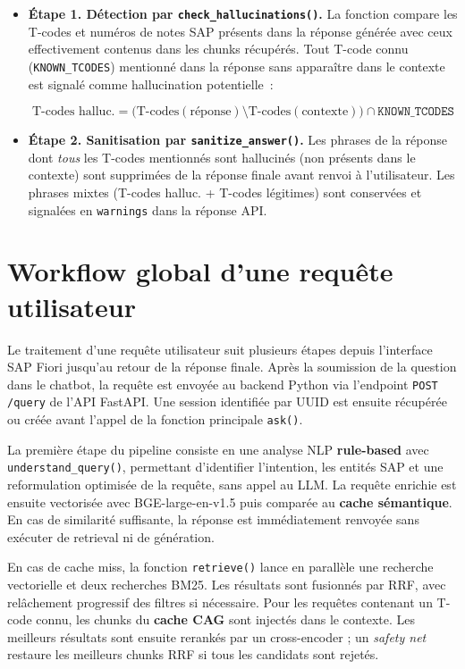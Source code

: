 \begin{itemize}
  \item \textbf{Étape 1. Détection par \texttt{check\_hallucinations()}.} La fonction compare les T-codes et numéros de notes SAP présents dans la réponse générée avec ceux effectivement contenus dans les chunks récupérés. Tout T-code connu (\texttt{KNOWN\_TCODES}) mentionné dans la réponse sans apparaître dans le contexte est signalé comme hallucination potentielle~:

\[
\text{T-codes halluc.} = \bigl(\text{T-codes}(\text{réponse}) \setminus \text{T-codes}(\text{contexte})\bigr) \cap \texttt{KNOWN\_TCODES}
\]

  \item \textbf{Étape 2. Sanitisation par \texttt{sanitize\_answer()}.} Les phrases de la réponse dont \textit{tous} les T-codes mentionnés sont hallucinés (non présents dans le contexte) sont supprimées de la réponse finale avant renvoi à l’utilisateur. Les phrases mixtes (T-codes halluc. + T-codes légitimes) sont conservées et signalées en \texttt{warnings} dans la réponse API.
\end{itemize}


\section{Workflow global d’une requête utilisateur}

Le traitement d’une requête utilisateur suit plusieurs étapes depuis l’interface SAP Fiori jusqu’au retour de la réponse finale. Après la soumission de la question dans le chatbot, la requête est envoyée au backend Python via l’endpoint \texttt{POST /query} de l’API FastAPI. Une session identifiée par UUID est ensuite récupérée ou créée avant l’appel de la fonction principale \texttt{ask()}.

La première étape du pipeline consiste en une analyse NLP \textbf{rule-based} avec \texttt{understand\_query()}, permettant d’identifier l’intention, les entités SAP et une reformulation optimisée de la requête, sans appel au LLM. La requête enrichie est ensuite vectorisée avec BGE-large-en-v1.5 puis comparée au \textbf{cache sémantique}. En cas de similarité suffisante, la réponse est immédiatement renvoyée sans exécuter de retrieval ni de génération.

En cas de cache miss, la fonction \texttt{retrieve()} lance en parallèle une recherche vectorielle et deux recherches BM25. Les résultats sont fusionnés par RRF, avec relâchement progressif des filtres si nécessaire. Pour les requêtes contenant un T-code connu, les chunks du \textbf{cache CAG} sont injectés dans le contexte. Les meilleurs résultats sont ensuite rerankés par un cross-encoder ; un \textit{safety net} restaure les meilleurs chunks RRF si tous les candidats sont rejetés.


